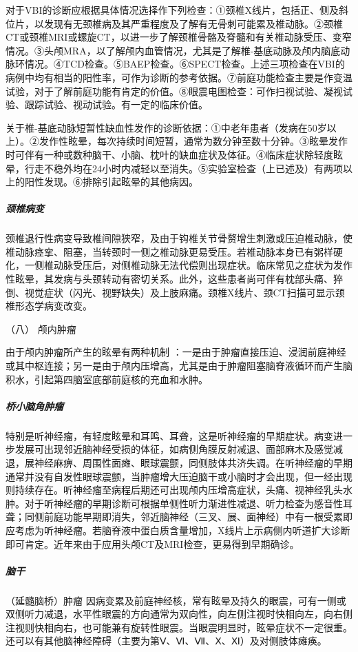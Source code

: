 对于VBI的诊断应根据具体情况选择作下列检查：①颈椎X线片，包括正、侧及斜位片，以发现有无颈椎病及其严重程度及了解有无骨刺可能累及椎动脉。②颈椎CT或颈椎MRI或螺旋CT，以进一步了解颈椎骨骼及脊髓和有关椎动脉受压、变窄情况。③头颅MRA，以了解颅内血管情况，尤其是了解椎-基底动脉及颅内脑底动脉环情况。④TCD检查。⑤BAEP检查。⑥SPECT检查。上述三项检查在VBI的病例中均有相当的阳性率，可作为诊断的参考依据。⑦前庭功能检查主要是作变温试验，对于了解前庭功能有肯定的价值。⑧眼震电图检查：可作扫视试验、凝视试验、跟踪试验、视动试验。有一定的临床价值。

关于椎-基底动脉短暂性缺血性发作的诊断依据：①中老年患者（发病在50岁以上）。②发作性眩晕，每次持续时间短暂，通常为数分钟至数十分钟。③眩晕发作时可伴有一种或数种脑干、小脑、枕叶的缺血症状及体征。④临床症状除轻度眩晕，行走不稳外均在24小时内减轻以至消失。⑤实验室检查（上已述及）有两项以上的阳性发现。⑥排除引起眩晕的其他病因。

\subparagraph{颈椎病变}

颈椎退行性病变导致椎间隙狭窄，及由于钩椎关节骨赘增生刺激或压迫椎动脉，使椎动脉痉挛、阻塞，当转颈时一侧之椎动脉更易受压。若椎动脉本身已有粥样硬化，一侧椎动脉受压后，对侧椎动脉无法代偿则出现症状。临床常见之症状为发作性眩晕，其发病与头颈转动有密切关系。此外，这些患者尚可伴有枕部头痛、猝倒、视觉症状（闪光、视野缺失）及上肢麻痛。颈椎X线片、颈CT扫描可显示颈椎形态学病变改变。

\hypertarget{text00012.htmlux5cux23CHP1-3-2-6-8}{}
（八） 颅内肿瘤

由于颅内肿瘤所产生的眩晕有两种机制
：一是由于肿瘤直接压迫、浸润前庭神经或其中枢连接；另一是由于颅内压增高，尤其是由于肿瘤阻塞脑脊液循环而产生脑积水，引起第四脑室底部前庭核的充血和水肿。

\subparagraph{桥小脑角肿瘤}

特别是听神经瘤，有轻度眩晕和耳鸣、耳聋，这是听神经瘤的早期症状。病变进一步发展可出现邻近脑神经受损的体征，如病侧角膜反射减退、面部麻木及感觉减退，展神经麻痹、周围性面瘫、眼球震颤，同侧肢体共济失调。在听神经瘤的早期通常并没有自发性眼球震颤，当肿瘤增大压迫脑干或小脑时才会出现，但一经出现则持续存在。听神经瘤至病程后期还可出现颅内压增高症状，头痛、视神经乳头水肿。对于听神经瘤的早期诊断可根据单侧性听力渐进性减退、听力检查为感音性耳聋；同侧前庭功能早期即消失，邻近脑神经（三叉、展、面神经）中有一根受累即应考虑为听神经瘤。若脑脊液中蛋白质含量增加，X线片上示病侧内听道扩大诊断即可肯定。近年来由于应用头颅CT及MRI检查，更易得到早期确诊。

\subparagraph{脑干}

（延髓脑桥）肿瘤
因病变累及前庭神经核，常有眩晕及持久的眼震，可有一侧或双侧听力减退，水平性眼震的方向通常为双向性，向左侧注视时快相向左，向右侧注视则快相向右，也可能兼有旋转性眼震。当眼震明显时，眩晕症状不一定很重。还可以有其他脑神经障碍（主要为第Ⅴ、Ⅵ、Ⅶ、Ⅹ、Ⅺ）及对侧肢体瘫痪。

